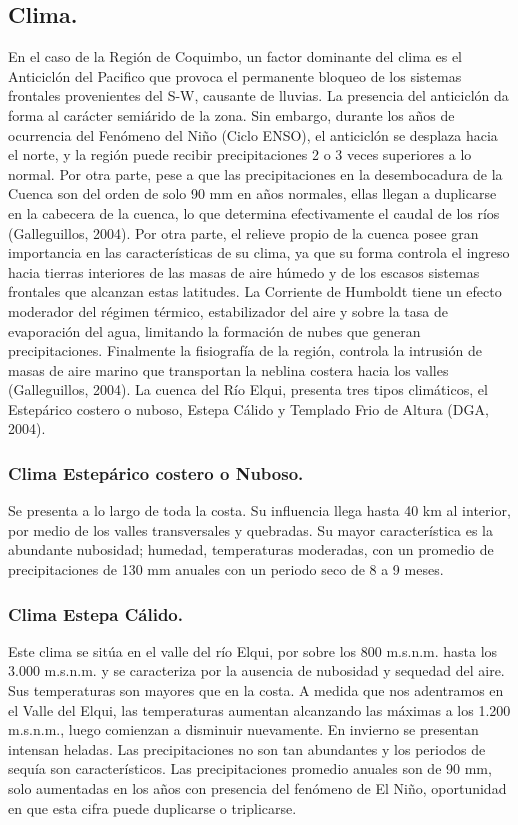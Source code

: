 \documentclass[11pt,]{article}
\begin{document}
\subsection{Clima.}
En el caso de la Región de Coquimbo, un factor dominante del clima es el Anticiclón del Pacifico que provoca el permanente bloqueo de los sistemas frontales provenientes del S-W, causante de lluvias. La presencia del anticiclón da forma al carácter semiárido de la zona. Sin embargo, durante los años de ocurrencia del Fenómeno del Niño (Ciclo ENSO), el anticiclón se desplaza hacia el norte, y la región puede recibir precipitaciones 2 o 3 veces superiores a lo normal. Por otra parte, pese a que las precipitaciones en la desembocadura de la Cuenca son del orden de solo 90 mm en años normales, ellas llegan a duplicarse en la cabecera de la cuenca, lo que determina efectivamente el caudal de los ríos (Galleguillos, 2004).
Por otra parte, el relieve propio de la cuenca posee gran importancia en las características de su clima, ya que su forma controla el ingreso hacia tierras interiores de las masas de aire húmedo y de los escasos sistemas frontales que alcanzan estas latitudes. 
La Corriente de Humboldt tiene un efecto moderador del régimen térmico, estabilizador del aire y sobre la tasa de evaporación del agua, limitando la formación de nubes que generan precipitaciones. Finalmente la fisiografía de la región, controla la intrusión de masas de aire marino que transportan la neblina costera hacia los valles (Galleguillos, 2004).
La cuenca del Río Elqui, presenta tres tipos climáticos, el Estepárico costero o nuboso, Estepa Cálido y Templado Frio de Altura (DGA, 2004).

		\subsubsection{Clima Estepárico costero o Nuboso.} 
Se presenta a lo largo de toda la costa. Su influencia llega hasta 40 km al interior, por medio de los valles transversales y quebradas. Su mayor característica es la abundante nubosidad; humedad, temperaturas moderadas, con un promedio de precipitaciones de 130 mm anuales con un periodo seco de 8 a 9 meses.

		\subsubsection{Clima Estepa Cálido.}
Este clima se sitúa en el valle del río Elqui, por sobre los 800 m.s.n.m. hasta los 3.000 m.s.n.m. y se caracteriza por la ausencia de nubosidad y sequedad del aire. Sus temperaturas son mayores que en la costa. A medida que nos adentramos en el Valle del Elqui, las temperaturas aumentan alcanzando las máximas a los 1.200 m.s.n.m., luego comienzan a disminuir nuevamente. En invierno se presentan intensan heladas. Las precipitaciones no son tan abundantes y los periodos de sequía son característicos. Las precipitaciones promedio anuales son de 90 mm, solo aumentadas en los años con presencia del fenómeno de El Niño, oportunidad en que esta cifra puede duplicarse o triplicarse.
		
\end{document}
